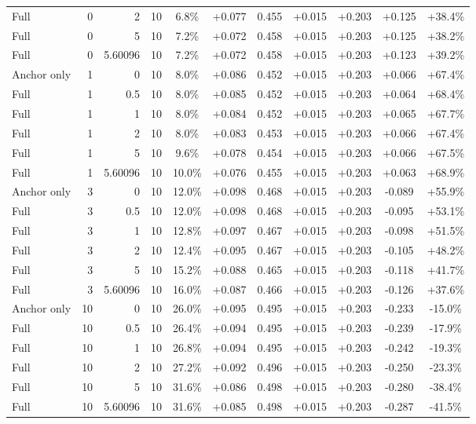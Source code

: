 \begin{table}[htbp]
\begin{tabular}{lrrrccccccc}
Full & 0 & 2 & 10 & 6.8\% & +0.077 & 0.455 & +0.015 & +0.203 & +0.125 & +38.4\% \\
Full & 0 & 5 & 10 & 7.2\% & +0.072 & 0.458 & +0.015 & +0.203 & +0.125 & +38.2\% \\
Full & 0 & 5.60096 & 10 & 7.2\% & +0.072 & 0.458 & +0.015 & +0.203 & +0.123 & +39.2\% \\
Anchor only & 1 & 0 & 10 & 8.0\% & +0.086 & 0.452 & +0.015 & +0.203 & +0.066 & +67.4\% \\
Full & 1 & 0.5 & 10 & 8.0\% & +0.085 & 0.452 & +0.015 & +0.203 & +0.064 & +68.4\% \\
Full & 1 & 1 & 10 & 8.0\% & +0.084 & 0.452 & +0.015 & +0.203 & +0.065 & +67.7\% \\
Full & 1 & 2 & 10 & 8.0\% & +0.083 & 0.453 & +0.015 & +0.203 & +0.066 & +67.4\% \\
Full & 1 & 5 & 10 & 9.6\% & +0.078 & 0.454 & +0.015 & +0.203 & +0.066 & +67.5\% \\
Full & 1 & 5.60096 & 10 & 10.0\% & +0.076 & 0.455 & +0.015 & +0.203 & +0.063 & +68.9\% \\
Anchor only & 3 & 0 & 10 & 12.0\% & +0.098 & 0.468 & +0.015 & +0.203 & -0.089 & +55.9\% \\
Full & 3 & 0.5 & 10 & 12.0\% & +0.098 & 0.468 & +0.015 & +0.203 & -0.095 & +53.1\% \\
Full & 3 & 1 & 10 & 12.8\% & +0.097 & 0.467 & +0.015 & +0.203 & -0.098 & +51.5\% \\
Full & 3 & 2 & 10 & 12.4\% & +0.095 & 0.467 & +0.015 & +0.203 & -0.105 & +48.2\% \\
Full & 3 & 5 & 10 & 15.2\% & +0.088 & 0.465 & +0.015 & +0.203 & -0.118 & +41.7\% \\
Full & 3 & 5.60096 & 10 & 16.0\% & +0.087 & 0.466 & +0.015 & +0.203 & -0.126 & +37.6\% \\
Anchor only & 10 & 0 & 10 & 26.0\% & +0.095 & 0.495 & +0.015 & +0.203 & -0.233 & -15.0\% \\
Full & 10 & 0.5 & 10 & 26.4\% & +0.094 & 0.495 & +0.015 & +0.203 & -0.239 & -17.9\% \\
Full & 10 & 1 & 10 & 26.8\% & +0.094 & 0.495 & +0.015 & +0.203 & -0.242 & -19.3\% \\
Full & 10 & 2 & 10 & 27.2\% & +0.092 & 0.496 & +0.015 & +0.203 & -0.250 & -23.3\% \\
Full & 10 & 5 & 10 & 31.6\% & +0.086 & 0.498 & +0.015 & +0.203 & -0.280 & -38.4\% \\
Full & 10 & 5.60096 & 10 & 31.6\% & +0.085 & 0.498 & +0.015 & +0.203 & -0.287 & -41.5\% \\

\end{tabular}
\end{table}
